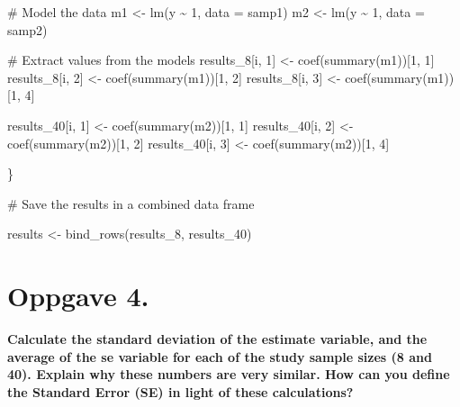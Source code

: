\documentclass[
  letterpaper,
  DIV=11,
  numbers=noendperiod]{scrreprt}
\newenvironment{Shaded}{\begin{snugshade}}{\end{snugshade}}
\newcommand{\AttributeTok}[1]{\textcolor[rgb]{0.40,0.45,0.13}{#1}}
\newcommand{\CommentTok}[1]{\textcolor[rgb]{0.37,0.37,0.37}{#1}}
\newcommand{\DecValTok}[1]{\textcolor[rgb]{0.68,0.00,0.00}{#1}}
\newcommand{\FunctionTok}[1]{\textcolor[rgb]{0.28,0.35,0.67}{#1}}
\newcommand{\NormalTok}[1]{\textcolor[rgb]{0.00,0.23,0.31}{#1}}
\newcommand{\OtherTok}[1]{\textcolor[rgb]{0.00,0.23,0.31}{#1}}
\newcommand{\SpecialCharTok}[1]{\textcolor[rgb]{0.37,0.37,0.37}{#1}}
\begin{document}
\begin{Shaded}
\begin{Highlighting}[]
  \CommentTok{\# Model the data}
\NormalTok{  m1 }\OtherTok{\textless{}{-}} \FunctionTok{lm}\NormalTok{(y }\SpecialCharTok{\textasciitilde{}} \DecValTok{1}\NormalTok{, }\AttributeTok{data =}\NormalTok{ samp1)}
\NormalTok{  m2 }\OtherTok{\textless{}{-}} \FunctionTok{lm}\NormalTok{(y }\SpecialCharTok{\textasciitilde{}} \DecValTok{1}\NormalTok{, }\AttributeTok{data =}\NormalTok{ samp2)}
  
  \CommentTok{\# Extract values from the models}
\NormalTok{  results\_8[i, }\DecValTok{1}\NormalTok{] }\OtherTok{\textless{}{-}} \FunctionTok{coef}\NormalTok{(}\FunctionTok{summary}\NormalTok{(m1))[}\DecValTok{1}\NormalTok{, }\DecValTok{1}\NormalTok{]}
\NormalTok{  results\_8[i, }\DecValTok{2}\NormalTok{] }\OtherTok{\textless{}{-}} \FunctionTok{coef}\NormalTok{(}\FunctionTok{summary}\NormalTok{(m1))[}\DecValTok{1}\NormalTok{, }\DecValTok{2}\NormalTok{]}
\NormalTok{  results\_8[i, }\DecValTok{3}\NormalTok{] }\OtherTok{\textless{}{-}} \FunctionTok{coef}\NormalTok{(}\FunctionTok{summary}\NormalTok{(m1))[}\DecValTok{1}\NormalTok{, }\DecValTok{4}\NormalTok{]}

\NormalTok{  results\_40[i, }\DecValTok{1}\NormalTok{] }\OtherTok{\textless{}{-}} \FunctionTok{coef}\NormalTok{(}\FunctionTok{summary}\NormalTok{(m2))[}\DecValTok{1}\NormalTok{, }\DecValTok{1}\NormalTok{]}
\NormalTok{  results\_40[i, }\DecValTok{2}\NormalTok{] }\OtherTok{\textless{}{-}} \FunctionTok{coef}\NormalTok{(}\FunctionTok{summary}\NormalTok{(m2))[}\DecValTok{1}\NormalTok{, }\DecValTok{2}\NormalTok{]}
\NormalTok{  results\_40[i, }\DecValTok{3}\NormalTok{] }\OtherTok{\textless{}{-}} \FunctionTok{coef}\NormalTok{(}\FunctionTok{summary}\NormalTok{(m2))[}\DecValTok{1}\NormalTok{, }\DecValTok{4}\NormalTok{]}
  
  
\NormalTok{\}}


\CommentTok{\# Save the results in a combined data frame}

\NormalTok{results }\OtherTok{\textless{}{-}} \FunctionTok{bind\_rows}\NormalTok{(results\_8, results\_40)}
\end{Highlighting}
\end{Shaded}

\section{Oppgave 4.}\label{oppgave-4.}

\textbf{Calculate the standard deviation of the estimate variable, and
the average of the se variable for each of the study sample sizes (8 and
40). Explain why these numbers are very similar. How can you define the
Standard Error (SE) in light of these calculations?}
\end{document}

